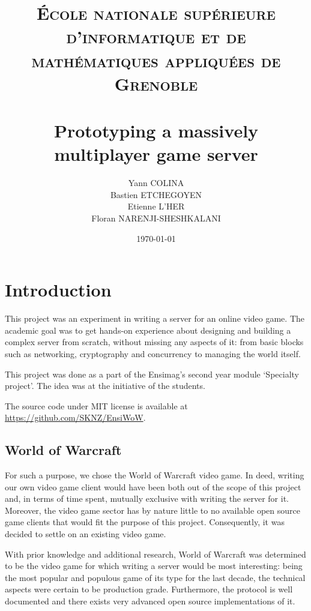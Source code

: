 \documentclass[paper=a4, fontsize=11pt]{scrartcl}
\title{%
    \normalfont{}
    \normalsize{}
    \textsc{École nationale supérieure d'informatique et de mathématiques appliquées de Grenoble} \\ [10pt]
    \horrule{0.5pt} \\[0.4cm]
    \huge Prototyping a massively multiplayer game server
    \horrule{2pt} \\[0.5cm]
}
\author{Yann COLINA\\
Bastien ETCHEGOYEN\\
Etienne L'HER\\
Floran NARENJI-SHESHKALANI}
\date{\normalsize\today}
\begin{document}
\maketitle

\iffalse{}
* Reflection
* Actor system/hierarchy
* API
* Diagrams
    * Actors hierarchy/messages
    * Client protocol
* Protocol (scodec)
* Handlers
* AuthServer
    * SRP6a
* WorldServer
    * RC4a
    * Actor interactions (EventStream)
* Reverse engineering difficulties
    * Big protocol, organicly built, too many features
* Sources
    * TrinityCore
    * Akka docs
    * Scala docs
    * scodec
* Scala
    * Functional
    * Immutable
    * Preferred language for Akka actors (ugly in Java)
    * Strongly typed
    * Full of syntaxic sugar
    * Ahead of it's time ('research language')
    * Home grown language (der Schweiz)

\fi

\section{Introduction}

This project was an experiment in writing a server for an online
video game.
The academic goal was to get hands-on experience about designing and building a
complex server from scratch, without missing any aspects of it: from basic blocks
such as networking, cryptography and concurrency to managing the world itself.

This project was done as a part of the Ensimag's second year module `Specialty
project'.
The idea was at the initiative of the students.

The source code under MIT license is available at
\url{https://github.com/SKNZ/EnsiWoW}.

\subsection{World of Warcraft}

For such a purpose, we chose the World of Warcraft video game.
In deed, writing our own video game client would have been both out of the scope
of this project and, in terms of time spent, mutually exclusive with writing the
server for it.
Moreover, the video game sector has by nature little to no available open source
game clients that would fit the purpose of this project.
Consequently, it was decided to settle on an existing video game.

With prior knowledge and additional research, World of Warcraft was determined to be the
video game for which writing a server would be most interesting: being the most
popular and populous game of its type for the last decade, the technical aspects
were certain to be production grade. Furthermore, the protocol is well
documented and there exists very advanced open source implementations of it.
\end{document}
